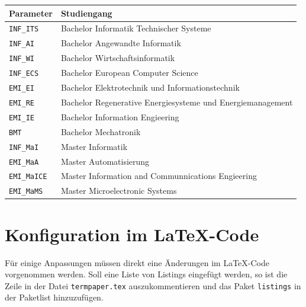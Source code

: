 \begin{center}
  \begin {tabular}{ll}
    Parameter & Studiengang \\
    \hline
    \texttt{INF\_ITS} & Bachelor Informatik Technischer Systeme \\
    \texttt{INF\_AI} & Bachelor Angewandte Informatik \\
    \texttt{INF\_WI} & Bachelor Wirtschaftsinformatik \\
    \texttt{INF\_ECS} & Bachelor European Computer Science \\
    \texttt{EMI\_EI} & Bachelor Elektrotechnik und Informationstechnik \\
    \texttt{EMI\_RE} & Bachelor Regenerative Energiesysteme und Energiemanagement \\
    \texttt{EMI\_IE} & Bachelor Information Engieering \\
    \texttt{BMT} & Bachelor Mechatronik \\
    \texttt{INF\_MaI} & Master Informatik \\
    \texttt{EMI\_MaA} & Master Automatisierung \\
    \texttt{EMI\_MaICE} & Master Information and Communnications Engieering \\
    \texttt{EMI\_MaMS} & Master Microelectronic Systems \\
  \end{tabular}
\end{center}

\section{Konfiguration im \LaTeX -Code}\label{sec:codechanges}
Für einige Anpassungen müssen direkt eine Änderungen im \LaTeX -Code vorgenommen werden. Soll eine Liste von Listings eingefügt werden, so ist die Zeile in der Datei \texttt{termpaper.tex} auszukommentieren und das Paket \texttt{listings} in der Paketlist hinzuzufügen.
